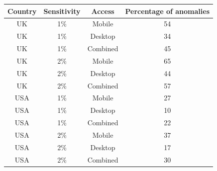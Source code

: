 \documentclass[12pt,letterpaper]{article}
\begin{document}
\begin{table}
    \begin{tabular}{cccc} 
   \hline
    Country & Sensitivity & Access   & Percentage of anomalies \\ \hline
    UK      & 1\%         & Mobile   & 54                      \\
    UK      & 1\%         & Desktop  & 34                      \\
    UK      & 1\%         & Combined & 45                      \\
    UK      & 2\%         & Mobile   & 65                      \\
    UK      & 2\%         & Desktop  & 44                      \\
    UK      & 2\%         & Combined & 57                      \\ \hline
    USA     & 1\%         & Mobile   & 27                      \\ 
    USA     & 1\%         & Desktop  & 10                      \\
    USA     & 1\%         & Combined & 22                      \\
    USA     & 2\%         & Mobile   & 37                      \\
    USA     & 2\%         & Desktop  & 17                      \\
    USA     & 2\%         & Combined & 30                      \\ \hline
    \end{tabular}
\end{table}



\end{document}
